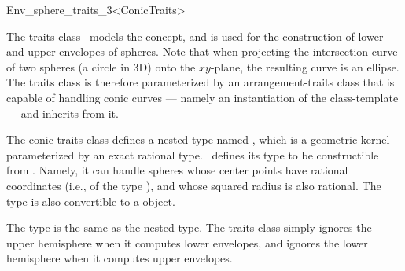 
\ccRefPageBegin

\begin{ccRefClass}{Env_sphere_traits_3<ConicTraits>}
    
\ccDefinition 

The traits class \ccRefName\ models the 
concept, and is used for the construction of lower and upper envelopes 
of spheres. Note that when projecting the intersection curve of two 
spheres (a circle in 3D) onto the $xy$-plane, the resulting curve is an 
ellipse. The traits class is therefore parameterized by an 
arrangement-traits class that is capable of handling conic 
curves --- namely an instantiation of the  
class-template --- and inherits from it.

The conic-traits class defines a nested type named ,
which is a geometric kernel parameterized by an exact rational type.
\ccRefName\ defines its  type to be constructible from
. Namely, it can handle spheres whose center
points have rational coordinates (i.e., of the type ),
and whose squared radius is also rational. The  type is
also convertible to a  object.

The  type is the same as the nested
 type. The traits-class simply ignores the upper
hemisphere when it computes lower envelopes, and ignores the lower
hemisphere when it computes upper envelopes.

 
\ccIsModel

\ccInheritsFrom

\end{ccRefClass}

\ccRefPageEnd
